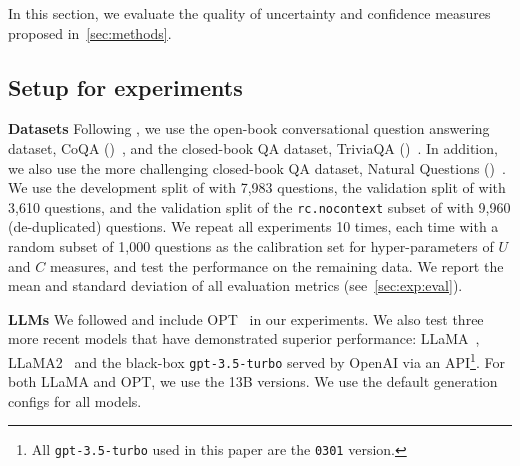 In this section, we evaluate the quality of uncertainty and confidence measures proposed in~\cref{sec:methods}.


\subsection{Setup for experiments}

\textbf{Datasets}
Following \citet{kuhn2023semantic}, we use the open-book conversational question answering dataset, CoQA (\datasetcoqa)~\citep{reddy-etal-2019-coqa}, and the closed-book QA dataset, TriviaQA (\datasettrivia)~\citep{joshi-etal-2017-triviaqa}.
In addition, we also use the more challenging closed-book QA dataset, Natural Questions (\datasetnqopen)~\citep{kwiatkowski-etal-2019-natural}.
We use the development split of \datasetcoqa with 7,983 questions, the validation split of \datasetnqopen with 3,610 questions, and the validation split of the \texttt{rc.nocontext} subset of \datasettrivia with 9,960 (de-duplicated) questions. 
We repeat all experiments 10 times, each time with a random subset of 1,000 questions as the calibration set for hyper-parameters of $U$ and $C$ measures, and test the performance on the remaining data. 
We report the mean and standard deviation of all evaluation metrics (see~\cref{sec:exp:eval}). 

\textbf{LLMs}
We followed \citet{kuhn2023semantic} and include OPT~\citep{zhang2022opt} in our experiments.
We also test three more recent models that have demonstrated superior performance: LLaMA~\citep{touvron2023llama}, LLaMA2~\citep{touvron2023llama2} and the black-box \texttt{gpt-3.5-turbo} served by OpenAI via an API\footnote{All \texttt{gpt-3.5-turbo} used in this paper are the \texttt{0301} version.}.
For both LLaMA and OPT, we use the 13B versions.
We use the default generation configs for all models.

